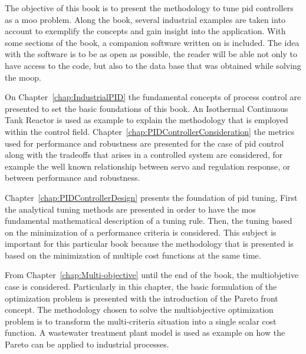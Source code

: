 The objective of this book is to present the methodology to tune \gls{pid} controllers as a \gls{moo} problem. Along the book, several industrial examples are taken into account to exemplify the concepts and gain insight into the application. With some sections of the book, a companion software written on \matlab is included. The idea with the software is to be as open as possible, the reader will be able not only to have access to the code, but also to the data base that was obtained while solving the \gls{moop}.

On Chapter~\ref{chap:IndustrialPID} the fundamental concepts of process control are presented to set the basic foundations of this book. An Isothermal Continuous Tank Reactor is used as example to explain the methodology that is employed within the control field. Chapter~\ref{chap:PIDControllerConsideration} the metrics used for performance and robustness are presented for the case of \gls{pid} control along with the tradeoffs that arises in a controlled system are considered, for example the well known relationship between servo and regulation response, or between performance and robustness.

Chapter~\ref{chap:PIDControllerDesign} presents the foundation of \gls{pid} tuning, First the analytical tuning methods are presented in order to have the mos fundamental mathematical description of a tuning rule. Then, the tuning based on the minimization of a performance criteria is considered. This subject is important for this particular book because the methodology that is presented is based on the minimization of multiple cost functions at the same time.

From Chapter~\ref{chap:Multi-objective} until the end of the book, the multiobjetive case is considered. Particularly in this chapter, the basic formulation of the optimization problem is presented with the introduction of the Pareto front concept. The methodology chosen to solve the multiobjective optimization problem is to transform the multi-criteria situation into a single scalar cost function. A wastewater treatment plant model is used as example on how the Pareto can be applied to industrial processes.

